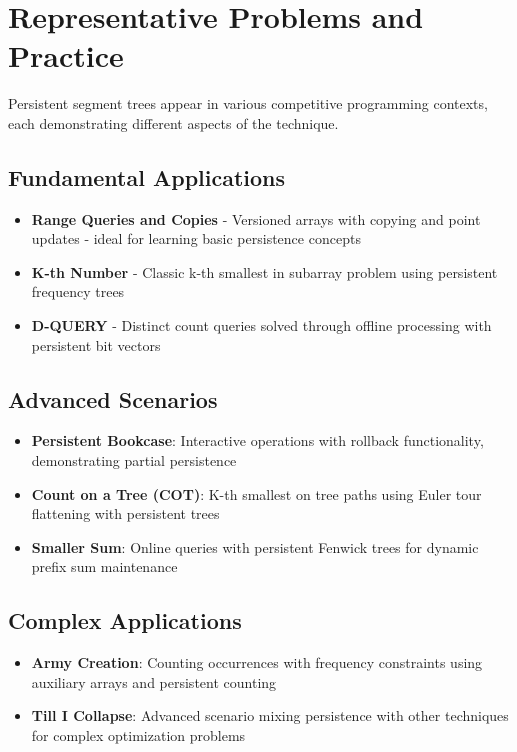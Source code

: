 \section{Representative Problems and Practice}
\label{sec:practice_problems}

Persistent segment trees appear in various competitive programming contexts, each demonstrating different aspects of the technique.

\subsection{Fundamental Applications}
\begin{itemize}
    \item \textbf{Range Queries and Copies} - Versioned arrays with copying and point updates - ideal for learning basic persistence concepts
    \item \textbf{K-th Number} - Classic k-th smallest in subarray problem using persistent frequency trees
    \item \textbf{D-QUERY} - Distinct count queries solved through offline processing with persistent bit vectors
\end{itemize}

\subsection{Advanced Scenarios}
\begin{itemize}
    \item \textbf{Persistent Bookcase}: Interactive operations with rollback functionality, demonstrating partial persistence
    \item \textbf{Count on a Tree (COT)}: K-th smallest on tree paths using Euler tour flattening with persistent trees
    \item \textbf{Smaller Sum}: Online queries with persistent Fenwick trees for dynamic prefix sum maintenance
\end{itemize}

\subsection{Complex Applications}
\begin{itemize}
    \item \textbf{Army Creation}: Counting occurrences with frequency constraints using auxiliary arrays and persistent counting
    \item \textbf{Till I Collapse}: Advanced scenario mixing persistence with other techniques for complex optimization problems
\end{itemize}

